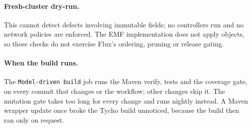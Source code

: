 \paragraph{Fresh-cluster dry-run.} This cannot detect defects involving immutable fields; no controllers run and no network policies are enforced. The
EMF implementation does not apply objects, so these checks do not exercise
Flux's ordering, pruning or release gating.

\paragraph{When the build runs.} The \texttt{Model-driven build} job runs the Maven
verify, tests and the coverage gate, on every commit that changes  or the
workflow; other changes skip it. The mutation gate takes too long for every change and runs
nightly instead. A Maven
wrapper update once broke the Tycho build unnoticed, because the build then ran only on request.
